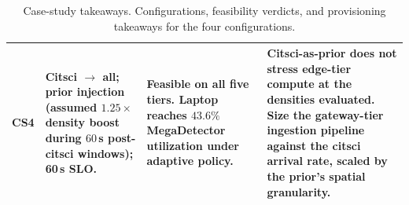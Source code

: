 \begin{table}[t]
\begin{tabular}{p{} p{} p{} p{}}
    \addlinespace
    CS4 & Citsci $\rightarrow$ all; prior injection (assumed $1.25\times$ density boost during $60$\,s post-citsci windows); 60\,s SLO. & Feasible on all five tiers. Laptop reaches $43.6\%$ MegaDetector utilization under adaptive policy. & Citsci-as-prior does not stress edge-tier compute at the densities evaluated. Size the gateway-tier ingestion pipeline against the citsci arrival rate, scaled by the prior's spatial granularity. \\
    \bottomrule
  \end{tabular}
  \caption{Case-study takeaways. Configurations, feasibility verdicts, and provisioning takeaways for the four configurations.}
  \label{tab:case-takeaways}
\end{table}
